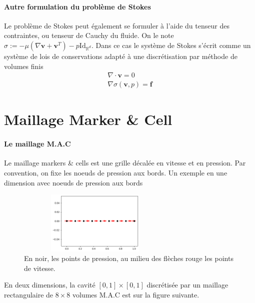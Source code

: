 \paragraph{Autre formulation du problème de Stokes} Le problème de Stokes peut également se formuler à l'aide du tenseur des contraintes, ou tenseur de Cauchy du fluide. On le note $\sigma := -\mu\left( \nabla \mathbf{v} + \mathbf{v}^T \right) - p \text{Id}_{\mathbb{R}^d}$. Dans ce cas le système de Stokes s'écrit comme un système de lois de conservations adapté à une discrétisation par méthode de volumes finis
\begin{align*}
    \nabla \cdot \mathbf{v} = 0 \\
    \nabla \sigma(\mathbf{v}, p) = \mathbf{f}
\end{align*}


\section{Maillage Marker \& Cell}

\paragraph{Le maillage M.A.C} Le maillage markers \& cells est une grille décalée en vitesse et en pression. Par convention, on fixe les noeuds de pression aux bords. Un exemple en une dimension avec noeuds de pression aux bords

\begin{figure}[htp]
    \centering
    \includegraphics[height=3cm, width=7.5cm]{Images/preliminaires/maillages/MAC 1D.png}
    \caption{En noir, les points de pression, au milieu des flèches rouge les points de vitesse.}
\end{figure}

\newpage

En deux dimensions, la cavité $[0,1]\times[0,1]$ discrétisée par un maillage rectangulaire de $8 \times 8$ volumes M.A.C est sur la figure suivante.

